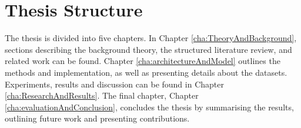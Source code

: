 \section{Thesis Structure}
\label{sec:thesisStructure}
The thesis is divided into five chapters. In Chapter \ref{cha:TheoryAndBackground}, sections describing the background theory, the structured literature review, and related work can be found. Chapter \ref{cha:architectureAndModel} outlines the methods and implementation, as well as presenting details about the datasets. Experiments, results and discussion can be found in Chapter \ref{cha:ResearchAndResults}. The final chapter, Chapter \ref{cha:evaluationAndConclusion}, concludes the thesis by summarising the results, outlining future work and presenting contributions.
